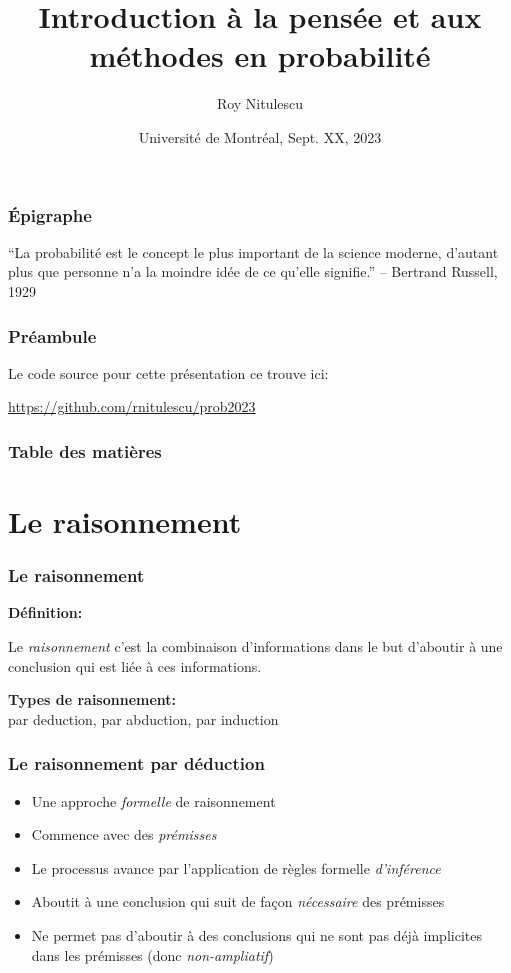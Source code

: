 \documentclass{beamer}
\title{Introduction à la pensée et aux méthodes en probabilité}
\author{Roy Nitulescu\inst{1}}
\institute
{
    \inst{1}%
    CITADEL\\
    CR-CHUM
}
\date[UdeM, Sept. XX, 2023]{Université de Montréal, Sept. XX, 2023}
\begin{document}

\frame{\titlepage}

\begin{frame}
    \frametitle{Épigraphe}
    ``La probabilité est le concept le plus important de la science moderne,
    d'autant plus que personne n'a la moindre idée de ce qu'elle signifie.'' -- Bertrand Russell, 1929
\end{frame}


\begin{frame}
    \frametitle{Préambule}
    
    Le code source pour cette présentation ce trouve ici:

    \vfill

    \url{https://github.com/rnitulescu/prob2023}
\end{frame}


\begin{frame}
    \frametitle{Table des matières}
    \tableofcontents
\end{frame}



\section{Le raisonnement}

\begin{frame}
    \frametitle{Le raisonnement}
    \textbf{Définition:}\

    \bigskip

    Le \emph{raisonnement} c’est la combinaison d’informations dans le
    but d’aboutir à une conclusion qui est liée à ces informations.\\

    \vfill \pause

    \textbf{Types de raisonnement:}\\

     par deduction, par abduction, par induction
\end{frame}


\begin{frame}
    \frametitle{Le raisonnement par déduction}
    \begin{itemize}
      \item Une approche \emph{formelle} de raisonnement \pause
      \item Commence avec des \emph{prémisses} \pause
      \item Le processus avance par l’application de règles formelle \emph{d’inférence} \pause
      \item Aboutit à une conclusion qui suit de façon \emph{nécessaire} des prémisses \pause
      \item Ne permet pas d’aboutir à des conclusions qui ne sont pas déjà
            implicites dans les prémisses (donc \emph{non-ampliatif})
    \end{itemize}
\end{frame}
\end{document}
